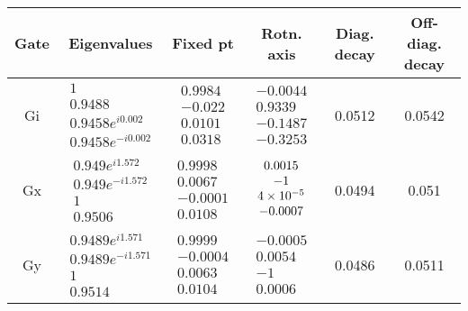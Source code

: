 {\begin{table}[h]
\begin{center}
\begin{tabular}[l]{|c|c|c|c|c|c|}
\hline
Gate & Eigenvalues & Fixed pt & Rotn. axis & Diag. decay & Off-diag. decay \\ \hline
Gi & $ \begin{array}{c}
1 \\ 
0.9488 \\ 
0.9458e^{i0.002} \\ 
0.9458e^{-i0.002}
 \end{array} $
 & $ \begin{array}{c}
0.9984 \\ 
-0.022 \\ 
0.0101 \\ 
0.0318
 \end{array} $
 & $ \begin{array}{c}
-0.0044 \\ 
0.9339 \\ 
-0.1487 \\ 
-0.3253
 \end{array} $
 & 0.0512 & 0.0542 \\ \hline
Gx & $ \begin{array}{c}
0.949e^{i1.572} \\ 
0.949e^{-i1.572} \\ 
1 \\ 
0.9506
 \end{array} $
 & $ \begin{array}{c}
0.9998 \\ 
0.0067 \\ 
-0.0001 \\ 
0.0108
 \end{array} $
 & $ \begin{array}{c}
0.0015 \\ 
-1 \\ 
4\times 10^{-5} \\ 
-0.0007
 \end{array} $
 & 0.0494 & 0.051 \\ \hline
Gy & $ \begin{array}{c}
0.9489e^{i1.571} \\ 
0.9489e^{-i1.571} \\ 
1 \\ 
0.9514
 \end{array} $
 & $ \begin{array}{c}
0.9999 \\ 
-0.0004 \\ 
0.0063 \\ 
0.0104
 \end{array} $
 & $ \begin{array}{c}
-0.0005 \\ 
0.0054 \\ 
-1 \\ 
0.0006
 \end{array} $
 & 0.0486 & 0.0511 \\ \hline
\end{tabular}


\end{center}
\end{table}}
